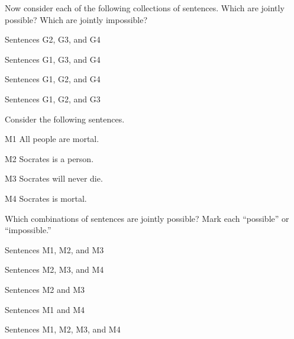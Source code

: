 Now consider each of the following collections of sentences. Which are jointly possible? Which are jointly impossible?
\begin{compactlist}
\item Sentences G2, G3, and G4
\item Sentences G1, G3, and G4
\item Sentences G1, G2, and G4
\item Sentences G1, G2, and G3
\end{compactlist}

\problempart Consider the following sentences.
\begin{compactlist}%
\item[M1] \label{itm:allmortal} All people are mortal.
\item[M2] \label{itm:socperson} Socrates is a person.
\item[M3] \label{itm:socnotdie} Socrates will never die.
\item[M4] \label{itm:socmortal} Socrates is mortal.
\end{compactlist}
Which combinations of sentences are jointly possible? Mark each ``possible'' or ``impossible.''
\begin{compactlist}
\item Sentences M1, M2, and M3
\item Sentences M2, M3, and M4
\item Sentences M2 and M3
\item Sentences M1 and M4
\item Sentences M1, M2, M3, and M4
\end{compactlist}

